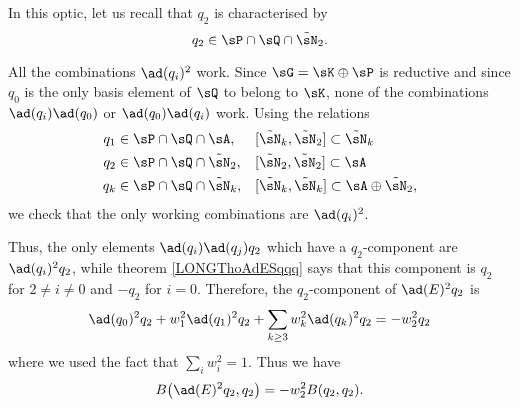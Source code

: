 In this optic, let us recall that $q_2$ is characterised by
\begin{equation}
	q_2\in\sP\cap\sQ\cap\tilde\sN_2.
\end{equation}

All the combinations $\ad(q_i)^2$ work. Since $\sG=\sK\oplus\sP$ is reductive and since $q_0$ is the only basis element of $\sQ$ to belong to $\sK$, none of the combinations $\ad(q_i)\ad(q_0)$ or $\ad(q_0)\ad(q_i)$ work. Using the relations
%
\begin{equation}
	\begin{aligned}[]
		q_1&\in\sP\cap\sQ\cap\sA	,	&&	[\tilde\sN_k,\tilde\sN_2]\subset\tilde\sN_k\\
		q_2&\in\sP\cap\sQ\cap\tilde\sN_2,	&&	[\tilde\sN_2,\tilde\sN_2]\subset\sA\\
		q_k&\in\sP\cap\sQ\cap\tilde\sN_k,	&&	[\tilde\sN_k,\tilde\sN_k]\subset\sA\oplus\tilde\sN_2,
	\end{aligned}
\end{equation}%
%
we check that the only working combinations are $\ad(q_i)^2$.

%

%

%

%

Thus, the only elements $\ad(q_i)\ad(q_j)q_2$ which have a $q_2$-component are $\ad(q_i)^2q_2$, while theorem \ref{LONGThoAdESqqq} says that this component is $q_2$ for $2\neq i\neq 0$ and $-q_2$ for $i=0$. Therefore, the $q_2$-component of $\ad(E)^2q_2$ is
\begin{equation}
	\ad(q_0)^2q_2+w_1^2\ad(q_1)^2q_2+\sum_{k\geq 3}w_k^2\ad(q_k)^2q_2=-w_2^2q_2
\end{equation}
where we used the fact that $\sum_i w_i^2=1$. Thus we have
\begin{equation}		\label{LONGEqBeDeuxqqwDeux}
	B\big( \ad(E)^2q_2,q_2 \big)=-w_2^2B(q_2,q_2).
\end{equation}

